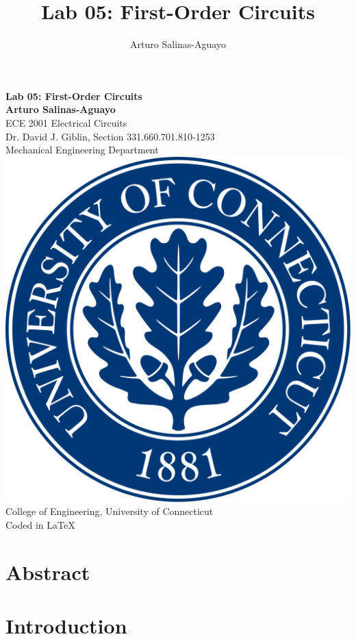 \documentclass[12pt]{article}
\author{Arturo Salinas-Aguayo}
\title{Lab 05: First-Order Circuits}
\begin{document}
\newcommand{\closure}[2][3]{%
	{}\mkern#1mu\overline{\mkern-#1mu#2}}
\newcommand\ncoverline[1]{\mkern1mu\overline{\mkern-1mu#1\mkern-1mu}\mkern1mu}
\begin{titlepage}
	\centering
	\vspace*{3cm}
	\huge\textbf{Lab 05: First-Order Circuits}\\
	
	\vspace{5cm}
	\Large\textbf{Arturo Salinas-Aguayo}\\
	\normalsize
	ECE 2001 Electrical Circuits\\
	Dr. David J. Giblin, Section 331.660.701.810-1253\\
	Mechanical Engineering Department
	\vfill
	\includegraphics[scale=0.1]{uconnlogo}\\
	College of Engineering, University of Connecticut\\
	\scriptsize{Coded in \LaTeX}
	\vspace*{1cm}
\end{titlepage}
\tableofcontents
\newpage
\section{Abstract}
\newpage
\section{Introduction}
\end{document}
